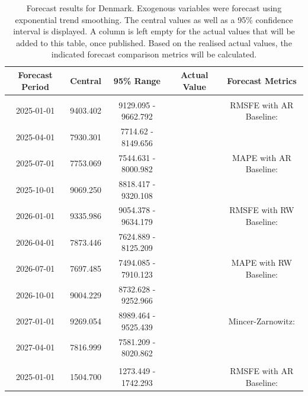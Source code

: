 \begin{table}
\centering
\caption{\label{tab:forecast_DK}Forecast results for Denmark. Exogenous variables were forecast using exponential trend smoothing. The central values as well as a 95\% confidence interval is displayed. A column is left empty for the actual values that will be added to this table, once published. Based on the realised actual values, the indicated forecast comparison metrics will be calculated. }
\centering
\fontsize{7}{9}\selectfont
\begin{tabular}[t]{ccccc}
\toprule
Forecast Period & Central & 95\% Range & Actual Value & Forecast Metrics\\
\midrule
\addlinespace[0.3em]
\multicolumn{5}{l}{\textbf{ElectrCons}}\\
\hspace{1em}2025-01-01 & 9403.402 & 9129.095 - 9662.792 &  & RMSFE with AR Baseline:\\
\hspace{1em}2025-04-01 & 7930.301 & 7714.62 - 8149.656 &  & \\
\hspace{1em}2025-07-01 & 7753.069 & 7544.631 - 8000.982 &  & MAPE with AR Baseline:\\
\hspace{1em}2025-10-01 & 9069.250 & 8818.417 - 9320.108 &  & \\
\hspace{1em}2026-01-01 & 9335.986 & 9054.378 - 9634.179 &  & RMSFE with RW Baseline:\\
\hspace{1em}2026-04-01 & 7873.446 & 7624.889 - 8125.209 &  & \\
\hspace{1em}2026-07-01 & 7697.485 & 7494.085 - 7910.123 &  & MAPE with RW Baseline:\\
\hspace{1em}2026-10-01 & 9004.229 & 8732.628 - 9252.966 &  & \\
\hspace{1em}2027-01-01 & 9269.054 & 8989.464 - 9525.439 &  & Mincer-Zarnowitz:\\
\hspace{1em}2027-04-01 & 7816.999 & 7581.209 - 8020.862 &  & \\
\addlinespace[0.3em]
\multicolumn{5}{l}{\textbf{EmiCO2ElecHeat}}\\
\hspace{1em}2025-01-01 & 1504.700 & 1273.449 - 1742.293 &  & RMSFE with AR Baseline:\\

\end{tabular}
\end{table}
